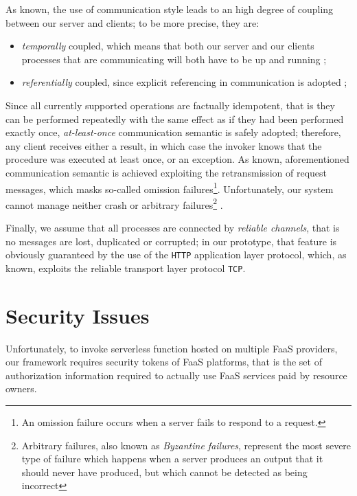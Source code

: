 \documentclass[12pt,a4paper]{report}
\begin{document}
As known, the use of communication style leads to an high degree of coupling between our server and clients; to be more precise, they are: 

\begin{itemize}
	
	\item \textit{temporally} coupled, which means that both our server and our clients processes that are communicating will both have to be up and running \cite{SDCC};
	
	\item \textit{referentially} coupled, since explicit referencing in communication is adopted \cite{SDCC};
	
\end{itemize}

Since all currently supported operations are factually idempotent, that is they can be performed repeatedly with the same effect as if they had been performed exactly once\cite{SDCCNUMERO2}, \textit{at-least-once} communication semantic is safely adopted; therefore, any client receives either a result, in which case the invoker knows that the procedure was executed at least once, or an exception. As known, aforementioned communication semantic is achieved exploiting the retransmission of request messages, which masks so-called omission failures\footnote{An omission failure occurs when a server fails to respond to a request.}. Unfortunately, our system cannot manage neither crash or arbitrary failures\footnote{Arbitrary failures, also known as \textit{Byzantine failures}, represent the most severe type of failure which happens when a server produces an output that it should never have produced, but which cannot be detected as being incorrect} \cite{SDCCNUMERO2}.

Finally, we assume that all processes are connected by \textit{reliable channels}, that is no messages are lost, duplicated or corrupted; in our prototype, that feature is obviously guaranteed by the use of the \texttt{HTTP} application layer protocol, which, as known, exploits the reliable transport layer protocol \texttt{TCP}. 

\section{Security Issues}

Unfortunately, to invoke serverless function hosted on multiple FaaS providers, our framework requires security tokens of  FaaS platforms, that is the set of authorization information required to actually use FaaS services  paid by resource owners. 
\end{document}
